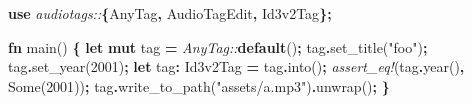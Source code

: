 \documentclass[
]{book}
\newenvironment{Shaded}{\begin{snugshade}}{\end{snugshade}}
\newcommand{\ConstantTok}[1]{\textcolor[rgb]{0.00,0.00,0.00}{#1}}
\newcommand{\DecValTok}[1]{\textcolor[rgb]{0.00,0.00,0.81}{#1}}
\newcommand{\KeywordTok}[1]{\textcolor[rgb]{0.13,0.29,0.53}{\textbf{#1}}}
\newcommand{\NormalTok}[1]{#1}
\newcommand{\OperatorTok}[1]{\textcolor[rgb]{0.81,0.36,0.00}{\textbf{#1}}}
\newcommand{\PreprocessorTok}[1]{\textcolor[rgb]{0.56,0.35,0.01}{\textit{#1}}}
\newcommand{\StringTok}[1]{\textcolor[rgb]{0.31,0.60,0.02}{#1}}
\begin{document}
\begin{Shaded}
\begin{Highlighting}[]
\KeywordTok{use} \PreprocessorTok{audiotags::}\OperatorTok{\{}\NormalTok{AnyTag}\OperatorTok{,}\NormalTok{ AudioTagEdit}\OperatorTok{,}\NormalTok{ Id3v2Tag}\OperatorTok{\};}

\KeywordTok{fn}\NormalTok{ main() }\OperatorTok{\{}
    \KeywordTok{let} \KeywordTok{mut}\NormalTok{ tag }\OperatorTok{=} \PreprocessorTok{AnyTag::}\KeywordTok{default}\NormalTok{()}\OperatorTok{;}
\NormalTok{    tag}\OperatorTok{.}\NormalTok{set\_title(}\StringTok{"foo"}\NormalTok{)}\OperatorTok{;}
\NormalTok{    tag}\OperatorTok{.}\NormalTok{set\_year(}\DecValTok{2001}\NormalTok{)}\OperatorTok{;}
    \KeywordTok{let}\NormalTok{ tag}\OperatorTok{:}\NormalTok{ Id3v2Tag }\OperatorTok{=}\NormalTok{ tag}\OperatorTok{.}\NormalTok{into()}\OperatorTok{;}
    \PreprocessorTok{assert\_eq!}\NormalTok{(tag}\OperatorTok{.}\NormalTok{year()}\OperatorTok{,} \ConstantTok{Some}\NormalTok{(}\DecValTok{2001}\NormalTok{))}\OperatorTok{;}
\NormalTok{    tag}\OperatorTok{.}\NormalTok{write\_to\_path(}\StringTok{"assets/a.mp3"}\NormalTok{)}\OperatorTok{.}\NormalTok{unwrap()}\OperatorTok{;}
\OperatorTok{\}}
\end{Highlighting}
\end{Shaded}


  
\end{document}
